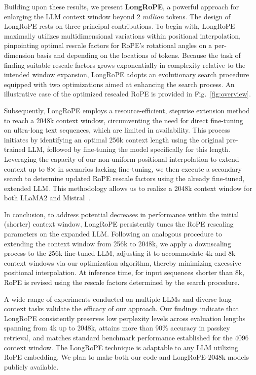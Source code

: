 Building upon these results, we present \textbf{LongRoPE}, a powerful approach for enlarging the LLM context window beyond 2 \emph{million} tokens. The design of LongRoPE rests on three principal contributions. To begin with, {LongRoPE} maximally utilizes multidimensional variations within positional interpolation, pinpointing optimal rescale factors for RoPE's rotational angles on a per-dimension basis and depending on the locations of tokens. Because the task of finding suitable rescale factors grows exponentially in complexity relative to the intended window expansion, {LongRoPE} adopts an evolutionary search procedure equipped with two optimizations aimed at enhancing the search process. An illustrative case of the optimized rescaled RoPE is provided in Fig.~\ref{fig:overview}.

Subsequently, {LongRoPE} employs a resource-efficient, stepwise extension method to reach a 2048k context window, circumventing the need for direct fine-tuning on ultra-long text sequences, which are limited in availability. This process initiates by identifying an optimal 256k context length using the original pre-trained LLM, followed by fine-tuning the model specifically for this length. Leveraging the capacity of our non-uniform positional interpolation to extend context up to 8$\times$ in scenarios lacking fine-tuning, we then execute a secondary search to determine updated RoPE rescale factors using the already fine-tuned, extended LLM. This methodology allows us to realize a 2048k context window for both LLaMA2 and Mistral~\cite{mistral}.

In conclusion, to address potential decreases in performance within the initial (shorter) context window, {LongRoPE} persistently tunes the RoPE rescaling parameters on the expanded LLM. Following an analogous procedure to extending the context window from 256k to 2048k, we apply a downscaling process to the 256k fine-tuned LLM, adjusting it to accommodate 4k and 8k context windows via our optimization algorithm, thereby minimizing excessive positional interpolation. At inference time, for input sequences shorter than 8k, RoPE is revised using the rescale factors determined by the search procedure.

A wide range of experiments conducted on multiple LLMs and diverse long-context tasks validate the efficacy of our approach. Our findings indicate that LongRoPE consistently preserves low perplexity levels across evaluation lengths spanning from 4k up to 2048k, attains more than 90\% accuracy in passkey retrieval, and matches standard benchmark performance established for the 4096 context window. The LongRoPE technique is adaptable to any LLM utilizing RoPE embedding. We plan to make both our code and LongRoPE-2048k models publicly available.

